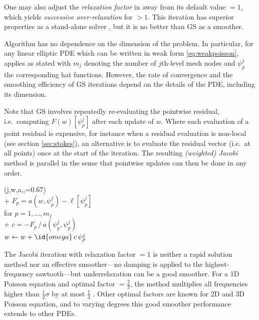 \documentclass[letterpaper,final,12pt,reqno]{amsart}
\theoremstyle{claim}
\numberwithin{equation}{section}
\numberwithin{figure}{section}
\numberwithin{table}{section}
\numberwithin{theorem}{section}
\begin{document}
One may also adjust the \emph{relaxation factor}  in  away from its default value  $=1$, which yields \emph{successive over-relaxation} for  $>1$.  This iteration has superior properties as a stand-alone solver \cite{Greenbaum1997}, but it is no better than GS as a smoother.

Algorithm  has no dependence on the dimension of the problem.  In particular, for any linear elliptic PDE which can be written in weak form \eqref{eq:weakpoisson},  applies as stated with $m_j$ denoting the number of $j$th-level mesh nodes and $\psi_p^j$ the corresponding hat functions.  However, the rate of convergence and the smoothing efficiency of GS iterations depend on the details of the PDE, including its dimension.

Note that GS involves repeatedly re-evaluating the pointwise residual, i.e.~computing $F(w)[\psi_p^j]$ after each update of $w$.  Where each evaluation of a point residual is expensive, for instance when a residual evaluation is non-local (see section \ref{sec:stokes}), an alternative is to evaluate the residual vector (i.e.~at all points) once at the start of the iteration.  The resulting \emph{(weighted) Jacobi} method is parallel in the sense that pointwise updates can then be done in any order.

\begin{pseudo*} \label{ps:jacobi-sweep}
(j,w,a,\ell,=0.67)\text{:} \\+
    $F_p = a(w,\psi_p^j) - \ell[\psi_p^j]$ \qquad\qquad\qquad\qquad {} \\
    for $p=1,\dots,m_j$ \\+
        $\displaystyle c = - F_p \, \big/ \, a(\psi_p^j,\psi_p^j)$  \\
        $w \gets w + \id{omega} \,c \,\psi_p^j$
\end{pseudo*}

The Jacobi iteration with relaxation factor  $=1$ is neither a rapid solution method nor an effective smoother---no damping is applied to the highest-frequency sawtooth---but underrelaxation can be a good smoother.  For a 1D Poisson equation and optimal factor  $=\frac{2}{3}$, the method multiplies all frequencies higher than $\frac{1}{2} \sigma$ by at most $\frac{1}{3}$ \cite[Chapter 4]{Briggsetal2000}.  Other optimal factors are known for 2D and 3D Poisson equation, and to varying degrees this good smoother performance extends to other PDEs.
\end{document}
